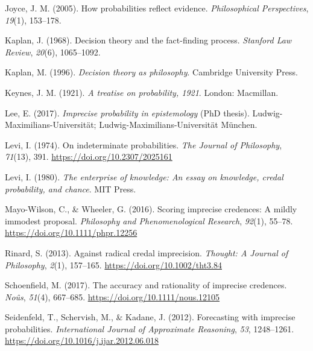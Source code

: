 \documentclass[
  10pt,
  dvipsnames,enabledeprecatedfontcommands]{scrartcl}
\newlength{\cslhangindent}
\newlength{\cslentryspacingunit} %
\newenvironment{CSLReferences}[2] %
 {%
  \setlength{\parindent}{0pt}
  \ifodd #1
  \let\oldpar\par
  \def\par{\hangindent=\cslhangindent\oldpar}
  \fi
  \setlength{\parskip}{#2\cslentryspacingunit}
 }%
 {}
\begin{document}
\begin{CSLReferences}{1}{0}
\leavevmode{}%
Joyce, J. M. (2005). How probabilities reflect evidence.
\emph{Philosophical Perspectives}, \emph{19}(1), 153--178.

\leavevmode{}%
Kaplan, J. (1968). Decision theory and the fact-finding process.
\emph{Stanford Law Review}, \emph{20}(6), 1065--1092.

\leavevmode{}%
Kaplan, M. (1996). \emph{Decision theory as philosophy}. Cambridge
University Press.

\leavevmode{}%
Keynes, J. M. (1921). \emph{A treatise on probability, 1921}. London:
Macmillan.

\leavevmode{}%
Lee, E. (2017). \emph{Imprecise probability in epistemology} (PhD
thesis). Ludwig-Maximilians-Universit{ä}t;
Ludwig-Maximilians-Universität München.

\leavevmode{}%
Levi, I. (1974). On indeterminate probabilities. \emph{The Journal of
Philosophy}, \emph{71}(13), 391. \url{https://doi.org/10.2307/2025161}

\leavevmode{}%
Levi, I. (1980). \emph{The enterprise of knowledge: An essay on
knowledge, credal probability, and chance}. MIT Press.

\leavevmode{}%
Mayo-Wilson, C., \& Wheeler, G. (2016). Scoring imprecise credences: A
mildly immodest proposal. \emph{Philosophy and Phenomenological
Research}, \emph{92}(1), 55--78.
\url{https://doi.org/10.1111/phpr.12256}

\leavevmode{}%
Rinard, S. (2013). Against radical credal imprecision. \emph{Thought: A
Journal of Philosophy}, \emph{2}(1), 157--165.
\url{https://doi.org/10.1002/tht3.84}

\leavevmode{}%
Schoenfield, M. (2017). The accuracy and rationality of imprecise
credences. \emph{Noûs}, \emph{51}(4), 667--685.
\url{https://doi.org/10.1111/nous.12105}

\leavevmode{}%
Seidenfeld, T., Schervish, M., \& Kadane, J. (2012). Forecasting with
imprecise probabilities. \emph{International Journal of Approximate
Reasoning}, \emph{53}, 1248--1261.
\url{https://doi.org/10.1016/j.ijar.2012.06.018}


\end{CSLReferences}
\end{document}
